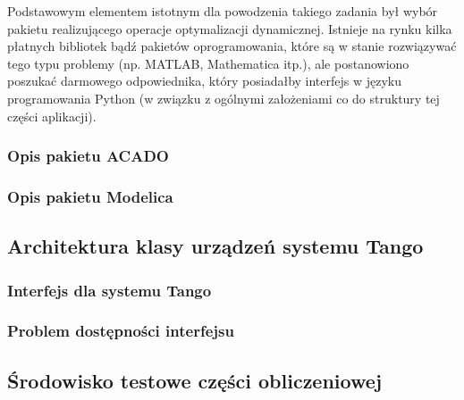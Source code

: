 Podstawowym elementem istotnym dla powodzenia takiego zadania był wybór pakietu realizującego operacje optymalizacji dynamicznej. Istnieje na rynku kilka płatnych bibliotek bądź pakietów oprogramowania, które są w stanie rozwiązywać tego typu problemy (np. MATLAB, Mathematica itp.), ale postanowiono poszukać darmowego odpowiednika, który posiadałby interfejs w języku programowania Python (w związku z ogólnymi założeniami co do struktury tej części aplikacji).


\subsubsection{Opis pakietu ACADO}


\subsubsection{Opis pakietu Modelica}



\subsection{Architektura klasy urządzeń systemu Tango}
\label{sub:czesc-wyzsza-klasa}


\subsubsection{Interfejs dla systemu Tango}


\subsubsection{Problem dostępności interfejsu}



\subsection{Środowisko testowe części obliczeniowej}
\label{sub:czesc-wyzsza-docker}